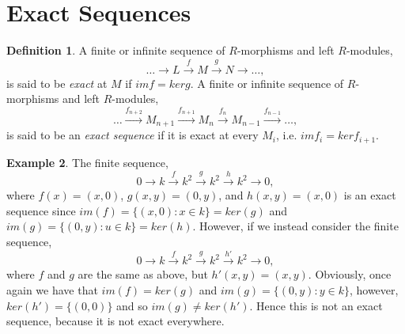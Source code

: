 \documentclass[11.5pt, twoside, a4paper, titlepage]{report}
\theoremstyle{definition}
\newtheorem{mydef}{Definition}[section]
\newtheorem{eg}[mydef]{Example}
\theoremstyle{plain}
\begin{document}

\section{Exact Sequences}

\begin{mydef}
A finite or infinite sequence of $R$-morphisms and left $R$-modules,
\begin{equation*}
\dots \xrightarrow{} L \xrightarrow{f}M \xrightarrow{g} N \xrightarrow{} \dots,
\end{equation*}
is said to be \emph{exact} at $M$ if $imf=kerg$. A finite or infinite sequence of $R$-morphisms and left $R$-modules,
\begin{equation*}
\dots \xrightarrow{f_{n+2}} M_{n+1} \xrightarrow{f_{n+1}} M_n \xrightarrow{f_n} M_{n-1} \xrightarrow{f_{n-1}} \dots,
\end{equation*}
is said to be an \emph{exact sequence} if it is exact at every $M_i$, i.e. $imf_i=kerf_{i+1}$. 
\end{mydef}

\begin{eg}
The finite sequence,
\begin{equation*}
0\xrightarrow{}k\xrightarrow{f}k^2\xrightarrow{g}k^2\xrightarrow{h}k^2\xrightarrow{}0,
\end{equation*}
where $f(x)=(x,0)$, $g(x, y)=(0,y)$, and $h(x,y)=(x,0)$ is an exact sequence since $im(f)=\{(x,0):x\in k\}=ker(g)$ and $im(g)=\{(0,y):u\in k\}=ker(h)$. 
However, if we instead consider the finite sequence, 
\begin{equation*}
0\xrightarrow{}k\xrightarrow{f}k^2\xrightarrow{g}k^2\xrightarrow{h'}k^2\xrightarrow{}0,
\end{equation*}
where $f$ and $g$ are the same as above, but $h'(x,y)=(x,y)$. Obviously, once again we have that $im(f)=ker(g)$ and $im(g)=\{(0,y):y\in k\}$, however, $ker(h')=\{(0,0)\}$ and so $im(g)\neq ker(h')$. Hence this is not an exact sequence, because it is not exact everywhere.
\end{eg}
\end{document}

